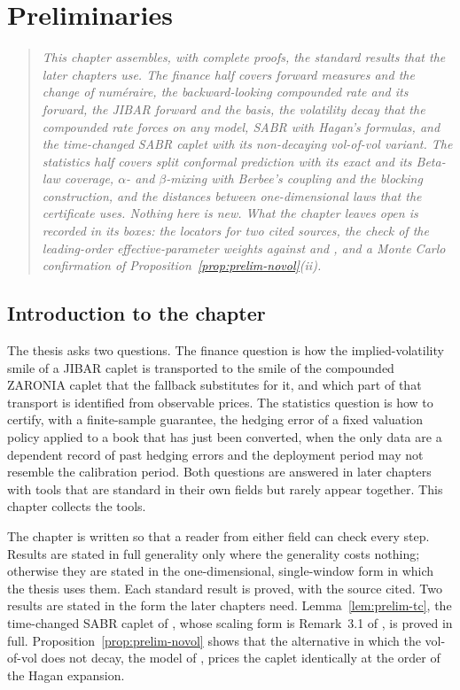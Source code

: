 \documentclass[../../../main.tex]{subfiles}
\begin{document}
\chapter{Preliminaries}\label{ch:prelim}\label{ch2-preliminaries}

\begin{quote}\itshape
This chapter assembles, with complete proofs, the standard results that the later chapters use. The finance half covers forward measures and the change of num\'eraire, the backward-looking compounded rate and its forward, the JIBAR forward and the basis, the volatility decay that the compounded rate forces on any model, SABR with Hagan's formulas, and the time-changed SABR caplet with its non-decaying vol-of-vol variant. The statistics half covers split conformal prediction with its exact and its Beta-law coverage, $\alpha$- and $\beta$-mixing with Berbee's coupling and the blocking construction, and the distances between one-dimensional laws that the certificate uses. Nothing here is new. What the chapter leaves open is recorded in its boxes: the locators for two cited sources, the check of the leading-order effective-parameter weights against \citet{willems2020} and \citet{hagan2002}, and a Monte Carlo confirmation of Proposition~\ref{prop:prelim-novol}(ii).
\end{quote}

\section{Introduction to the chapter}\label{sec:prelim-intro}

The thesis asks two questions. The finance question is how the implied-volatility smile of a JIBAR caplet is transported to the smile of the compounded ZARONIA caplet that the fallback substitutes for it, and which part of that transport is identified from observable prices. The statistics question is how to certify, with a finite-sample guarantee, the hedging error of a fixed valuation policy applied to a book that has just been converted, when the only data are a dependent record of past hedging errors and the deployment period may not resemble the calibration period. Both questions are answered in later chapters with tools that are standard in their own fields but rarely appear together. This chapter collects the tools.

The chapter is written so that a reader from either field can check every step. Results are stated in full generality only where the generality costs nothing; otherwise they are stated in the one-dimensional, single-window form in which the thesis uses them. Each standard result is proved, with the source cited. Two results are stated in the form the later chapters need. Lemma~\ref{lem:prelim-tc}, the time-changed SABR caplet of \cite{lyashenko2019}, whose scaling form is Remark~3.1 of \cite{willems2020}, is proved in full. Proposition~\ref{prop:prelim-novol} shows that the alternative in which the vol-of-vol does not decay, the model of \cite[eqs.~(3)--(4), p.~4]{willems2020}, prices the caplet identically at the order of the Hagan expansion.
\end{document}

